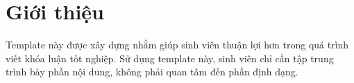 \chapter{Giới thiệu}
\label{Chapter1}

Template này được xây dựng nhằm giúp sinh viên thuận lợi hơn trong quá trình viết khóa luận tốt nghiệp.
Sử dụng template này, sinh viên chỉ cần tập trung trình bày phần nội dung, không phải quan tâm đến phần định dạng.
